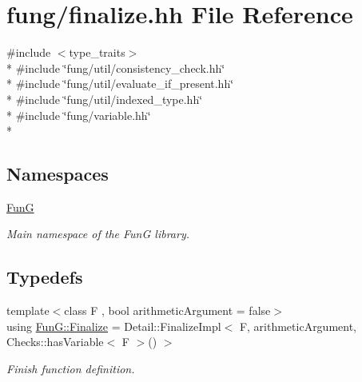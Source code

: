 \hypertarget{finalize_8hh}{}\section{fung/finalize.hh File Reference}
\label{finalize_8hh}
{\ttfamily \#include $<$type\+\_\+traits$>$}\\*
{\ttfamily \#include \char`\"{}fung/util/consistency\+\_\+check.\+hh\char`\"{}}\\*
{\ttfamily \#include \char`\"{}fung/util/evaluate\+\_\+if\+\_\+present.\+hh\char`\"{}}\\*
{\ttfamily \#include \char`\"{}fung/util/indexed\+\_\+type.\+hh\char`\"{}}\\*
{\ttfamily \#include \char`\"{}fung/variable.\+hh\char`\"{}}\\*
\subsection*{Namespaces}
\begin{DoxyCompactItemize}
\item 
 \hyperlink{namespaceFunG}{Fun\+G}
\begin{DoxyCompactList}\small\item\em Main namespace of the Fun\+G library. \end{DoxyCompactList}\end{DoxyCompactItemize}
\subsection*{Typedefs}
\begin{DoxyCompactItemize}
\item 
{\footnotesize template$<$class F , bool arithmetic\+Argument = false$>$ }\\using \hyperlink{namespaceFunG_ab2a52dfbc62e262c67f293fda5f81ef7}{Fun\+G\+::\+Finalize} = Detail\+::\+Finalize\+Impl$<$ F, arithmetic\+Argument, Checks\+::has\+Variable$<$ F $>$() $>$
\begin{DoxyCompactList}\small\item\em Finish function definition. \end{DoxyCompactList}\end{DoxyCompactItemize}
